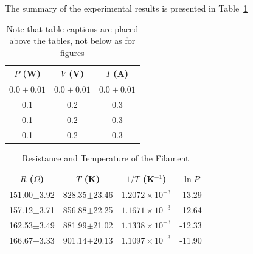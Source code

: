\documentclass[11pt, a4paper]{article}
\begin{document}
%


The summary of the experimental results is presented in Table~\ref{tab:summary}

\begin{table}[htbp]
\caption{Note that table captions are placed above the tables, not below as for figures}
\label{tab:summary}
\begin{center}
\begin{tabular}{ccc}
\hline
 $P$ (W)      & $V$ (V)       & $I$ (A)   \\
\hline
$0.0\pm0.01$ & $0.0\pm0.01$ & $0.0\pm0.01$  \\
 0.1         & 0.2          &  0.3         \\
 0.1         & 0.2          &  0.3         \\
 0.1         & 0.2          &  0.3         \\

\hline
\end{tabular}
\end{center}
\end{table}


\begin{table}[htbp]
\caption{Resistance and Temperature of the Filament}
\label{tab:data}
\begin{center}
\begin{tabular}{|c||c|c|c|}
\hline
$R$ ($\Omega$) & $T$ (K) & $1/T$ (K$^{-1}$) & $\ln P$ \\
\hline\hline
151.00$\pm$3.92 & 828.35$\pm$23.46& $1.2072\times10^{-3}$& -13.29 \\ \hline
157.12$\pm$3.71 & 856.88$\pm$22.25& $1.1671\times10^{-3}$& -12.64 \\ \hline
162.53$\pm$3.49 & 881.99$\pm$21.02& $1.1338\times10^{-3}$& -12.33 \\ \hline
166.67$\pm$3.33 & 901.14$\pm$20.13& $1.1097\times10^{-3}$& -11.90 \\ \hline
\hline
\end{tabular}
\end{center}  
\end{table}
\end{document}
